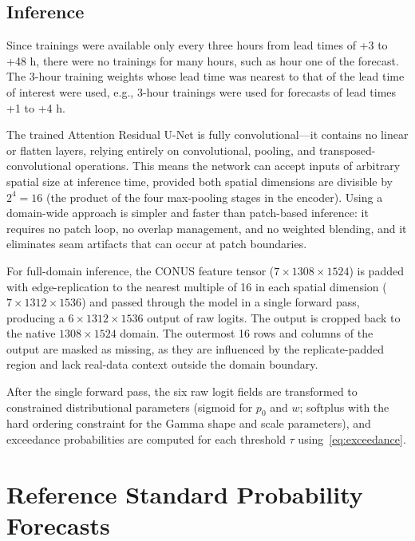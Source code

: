 \documentclass[11pt]{article}
\begin{document}
\subsection{Inference}
\label{sec:inference}

Since trainings were available only every three hours from lead times
of +3 to +48 h, there were no trainings for many hours, such as hour one 
of the forecast.   The 3-hour training weights whose lead time was nearest 
to that of the lead time of interest were used, e.g., 3-hour trainings were used 
for forecasts of lead times +1 to +4 h.

The trained Attention Residual U-Net is fully convolutional---it contains no
linear or flatten layers, relying entirely on convolutional, pooling,
and transposed-convolutional operations.  This means the network can
accept inputs of arbitrary spatial size at inference time, provided
both spatial dimensions are divisible by $2^4 = 16$ (the product of
the four max-pooling stages in the encoder). Using a domain-wide 
approach is simpler and faster than patch-based inference: it
requires no patch loop, no overlap management, and no weighted blending,
and it eliminates seam artifacts that can occur at patch boundaries.

For full-domain inference, the CONUS feature tensor
($7 \times 1308 \times 1524$) is padded with edge-replication to the
nearest multiple of 16 in each spatial dimension
($7 \times 1312 \times 1536$) and passed through the model in a single
forward pass, producing a $6 \times 1312 \times 1536$ output of raw
logits.  The output is cropped back to the native $1308 \times 1524$
domain.  The outermost 16 rows and columns of the output are masked as
missing, as they are influenced by the replicate-padded region and lack
real-data context outside the domain boundary.

After the single forward pass, the six raw logit fields are transformed to
constrained distributional parameters (sigmoid for $p_0$ and $w$;
softplus with the hard ordering constraint for the Gamma shape and scale
parameters), and exceedance probabilities are computed for each threshold
$\tau$ using~\eqref{eq:exceedance}.

\section{Reference Standard Probability Forecasts}
\label{sec:reference}
\end{document}
